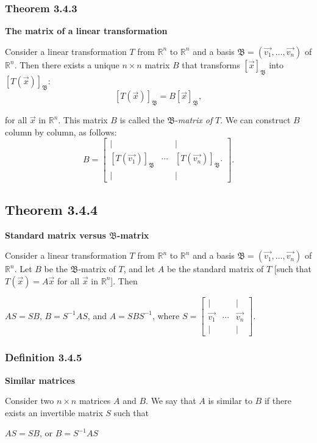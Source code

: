 \documentclass{report}
\begin{document}
\subsubsection*{Theorem 3.4.3}
\par\noindent\textbf{The matrix of a linear transformation}
\par\noindent Consider a linear transformation $T$ from $\mathbb{R}^{n}$ to $\mathbb{R}^{n}$ and a basis $\mathfrak{B}=(\vec{v_{1}},\ldots{},\vec{v_{n}})$ of $\mathbb{R}^{n}$. Then there exists a unique $n\times{}n$ matrix $B$ that transforms $[\vec{x}]_{\mathfrak{B}}$ into $[T(\vec{x})]_{\mathfrak{B}}$:
\[[T(\vec{x})]_{\mathfrak{B}}=B[\vec{x}]_{\mathfrak{B}},\]
\par\noindent for all $\vec{x}$ in $\mathbb{R}^{n}$. This matrix $B$ is called the $\mathfrak{B}$-\textit{matrix of }$T$. We can construct $B$ column by column, as follows:
\[B=\left[\begin{array}{ccc}|& &|\\{} [T(\vec{v_{1}})]_{\mathfrak{B}}&\cdots{}&[T(\vec{v_{n}})]_{\mathfrak{B}}.\\ |& &|\end{array}\right].\]
\subsection*{Theorem 3.4.4}
\par\noindent\textbf{Standard matrix versus $\mathfrak{B}$-matrix}
\par\noindent Consider a linear transformation $T$ from $\mathbb{R}^{n}$ to $\mathbb{R}^{n}$ and a basis $\mathfrak{B}=(\vec{v_{1}},\ldots{},\vec{v_{n}})$ of $\mathbb{R}^{n}$. Let $B$ be the $\mathfrak{B}$-matrix of $T$, and let $A$ be the standard matrix of $T$ [such that $T(\vec{x})=A\vec{x}$ for all $\vec{x}$ in $\mathbb{R}^{n}$]. Then
\par\noindent $AS=SB$, $B=S^{-1}AS$, and $A=SBS^{-1}$, where $\displaystyle S=\left[\begin{array}{ccc}|& &|\\ \vec{v_{1}}&\cdots{}&\vec{v_{n}}\\ |& &|\end{array}\right]$.
\subsubsection*{Definition 3.4.5}
\par\noindent\textbf{Similar matrices}
\par\noindent Consider two $n\times{}n$ matrices $A$ and $B$. We say that $A$ is similar to $B$ if there exists an invertible matrix $S$ such that
\par\noindent\begin{center}$AS=SB$, or $B=S^{-1}AS$\end{center}
\end{document}
